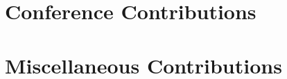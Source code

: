 \section*{Conference Contributions}

\begin{refsection}
\nocite{
gunter2010using,
ditmar2010mitigation,
hashemi2010contribution,
gunter2011investigation,
gunter2012potential,
doornbos2012thermospheric,
Olsen2013,
doornbos2013air,
bruinsma2014results,
astafyeva2015ionospheric,
doornbos2015processing,
Siemes2015,
jaggi2016european,
siemes2016improvements,
doornbos2016thermospheric}
\printbibliography
\end{refsection}


\section*{Miscellaneous Contributions}

\begin{refsection}
\nocite{
Iran-Pour2015,
Anselmi2010}
\printbibliography
\end{refsection}







